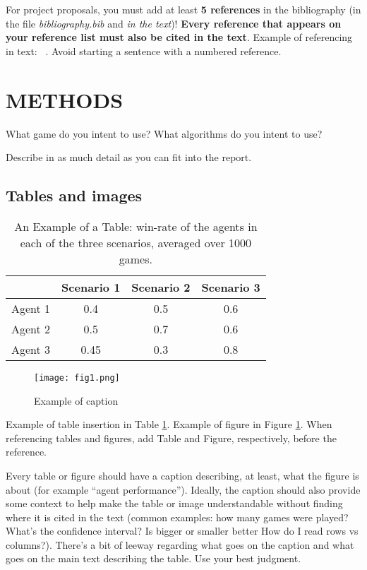 \documentclass[conference]{IEEEtran}
\begin{document}
For project proposals, you must add at least \textbf{5 references} in the bibliography (in the file \textit{bibliography.bib} and \textit{in the text})! \textbf{Every reference that appears on your reference list must also be cited in the text}. Example of referencing in text: ~\cite{togelius2007towards}. Avoid starting a sentence with a numbered reference.

\section{METHODS}

What game do you intent to use? What algorithms do you intent to use?

Describe in as much detail as you can fit into the report.


\subsection{Tables and images}

\begin{table}[h]
\caption{An Example of a Table: win-rate of the agents in each of the three scenarios, averaged over 1000 games. }
\label{table_example}
\begin{center}
\begin{tabular}{|c||c|c|c|}
\hline
  & Scenario 1 & Scenario 2 & Scenario 3\\
\hline
\hline
Agent 1 & 0.4 & 0.5 & 0.6\\
\hline
Agent 2 & 0.5 & 0.7 & 0.6 \\
\hline
Agent 3 & 0.45 & 0.3 & 0.8 \\
\hline
\end{tabular}
\end{center}
\end{table}


   \begin{figure}[thpb]
      \centering

      \texttt{[image: fig1.png]}
      \caption{Example of caption}
      \label{figurelabel}
   \end{figure}

Example of table insertion in Table \ref{table_example}. Example of figure in Figure \ref{figurelabel}. When referencing tables and figures, add Table and Figure, respectively, before the reference.

Every table or figure should have a caption describing, at least, what the figure is about (for example ``agent performance''). Ideally, the caption should also provide some context to help make the table or image understandable without finding where it is cited in the text (common examples: how many games were played? What's the confidence interval? Is bigger or smaller better How do I read rows vs columns?). There's a bit of leeway regarding what goes on the caption and what goes on the main text describing the table. Use your best judgment.
\end{document}
